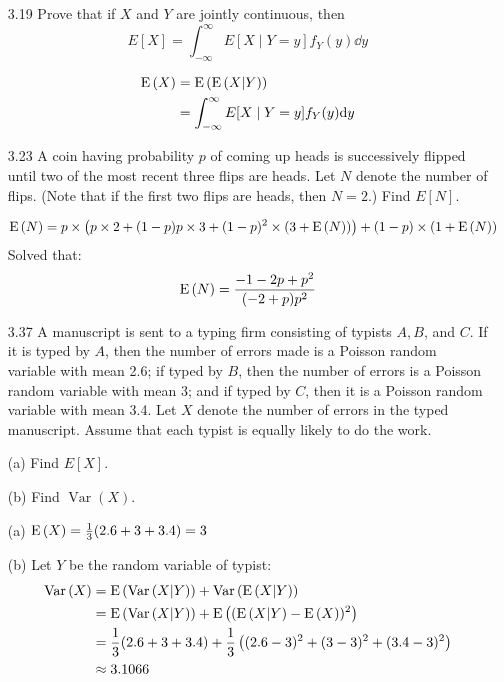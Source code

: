 \documentclass[en,hazy,blue,12pt,device = normal]{elegantnote}
\begin{document}
\begin{enumerate}
    \item[3.19] Prove that if $X$ and $Y$ are jointly continuous, then
    $$
    E[X]=\int_{-\infty}^{\infty} E[X \mid Y=y] f_Y(y) \dd y
    $$

    \begin{tcolorbox}
        \sol
        \begin{align*}
            \operatorname E\left(X\right) &= \operatorname E\left(\operatorname E\left(X|Y\right)\right)\\
            &=\int_{-\infty}^{\infty} E[X \mid Y=y] f_Y(y) \text{d} y
        \end{align*}
    \end{tcolorbox}

    \item[3.23]A coin having probability $p$ of coming up heads is successively flipped until two of the most recent three flips are heads. Let $N$ denote the number of flips. (Note that if the first two flips are heads, then $N=2$.) Find $E[N]$.
    \begin{tcolorbox}
        \sol
        \begin{align*}
            \operatorname E\left(N\right) &= p\times\left(p \times 2 + (1-p) p\times 3 + (1-p)^2 \times (3+\operatorname E\left(N\right)) \right) + (1-p) \times (1+\operatorname E\left(N\right))
        \end{align*}
        Solved that:
        \[\operatorname E\left(N\right) = \frac{-1 - 2 p + p^2}{(-2 + p) p^2}\]
    \end{tcolorbox}

    \item[3.37]A manuscript is sent to a typing firm consisting of typists $A, B$, and $C$. If it is typed by $A$, then the number of errors made is a Poisson random variable with mean 2.6; if typed by $B$, then the number of errors is a Poisson random variable with mean 3; and if typed by $C$, then it is a Poisson random variable with mean 3.4. Let $X$ denote the number of errors in the typed manuscript. Assume that each typist is equally likely to do the work.
    
    (a) Find $E[X]$.

    (b) Find $\operatorname{Var}(X)$.

    \begin{tcolorbox}
        \sol

        (a) \(\operatorname E\left(X\right) = \frac 1 3 (2.6+3+3.4) = 3\)

        (b) Let \(Y\) be the random variable of typist:
        \begin{align*}
            \operatorname{Var}\left(X\right) &= \operatorname E\left(\operatorname{Var}\left(X|Y\right)\right) + \operatorname{Var}\left(\operatorname E\left(X|Y\right)\right)\\
            &= \operatorname E\left(\operatorname{Var}\left(X|Y\right)\right)+ \operatorname E\left((\operatorname E\left(X|Y\right) - \operatorname E\left(X\right))^2\right)\\
            &= \frac 1 3 (2.6+3+3.4) + \frac 1 3 \left((2.6-3)^2+ (3-3)^2 + (3.4-3)^2\right)\\
            &\approx 3.1066
        \end{align*}
    \end{tcolorbox}


\end{enumerate}
\end{document}
